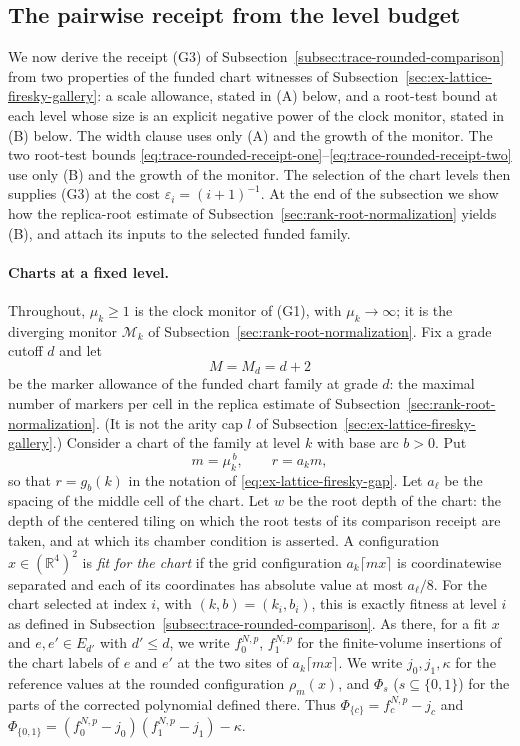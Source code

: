 \subsection{The pairwise receipt from the level budget}
\label{subsec:trace-rounded-receipt}

We now derive the receipt (G3) of
Subsection~\ref{subsec:trace-rounded-comparison} from two properties of
the funded chart witnesses of
Subsection~\ref{sec:ex-lattice-firesky-gallery}: a scale allowance, stated in
(A) below, and a root-test bound at each level whose size is an explicit
negative power of the clock monitor, stated in (B) below. The width clause
uses only (A) and the growth of the monitor. The two root-test bounds
\eqref{eq:trace-rounded-receipt-one}--\eqref{eq:trace-rounded-receipt-two}
use only (B) and the growth of the monitor. The selection of the chart
levels then supplies (G3) at the cost $\varepsilon_i=(i+1)^{-1}$. At the
end of the subsection we show how the replica-root estimate of
Subsection~\ref{sec:rank-root-normalization} yields (B), and attach its inputs to the selected funded family.

\paragraph{Charts at a fixed level.}
Throughout, $\mu_k\ge1$ is the clock monitor of (G1), with
$\mu_k\to\infty$; it is the diverging monitor $\mathcal M_k$ of
Subsection~\ref{sec:rank-root-normalization}. Fix a grade cutoff $d$ and
let
\[
 M=M_d=d+2
\]
be the marker allowance of the funded chart family at grade $d$: the
maximal number of markers per cell in the replica estimate of
Subsection~\ref{sec:rank-root-normalization}. (It is not the arity cap $l$
of Subsection~\ref{sec:ex-lattice-firesky-gallery}.) Consider a chart of the
family at level $k$ with base arc $b>0$. Put
\[
 m=\mu_k^{\,b},\qquad r=a_km,
\]
so that $r=g_b(k)$ in the notation of \eqref{eq:ex-lattice-firesky-gap}.
Let $a_{\ell}$ be the spacing of the middle cell of the chart. Let $w$ be
the root depth of the chart: the depth of the centered tiling on which
the root tests of its comparison receipt are taken, and at which its
chamber condition is asserted. A configuration $x\in(\mathbb R^4)^2$ is
\emph{fit for the chart} if the grid configuration $a_k\lceil mx\rceil$
is coordinatewise separated and each of its coordinates has absolute
value at most $a_\ell/8$. For the chart selected at index $i$, with
$(k,b)=(k_i,b_i)$, this is exactly fitness at level $i$ as defined in
Subsection~\ref{subsec:trace-rounded-comparison}. As there, for a fit
$x$ and $e,e'\in E_{d'}$ with $d'\le d$, we write $f_0^{N,p}$,
$f_1^{N,p}$ for the finite-volume insertions of the chart labels of $e$
and $e'$ at the two sites of $a_k\lceil mx\rceil$. We write
$j_0,j_1,\kappa$ for the reference values at the rounded configuration
$\rho_m(x)$, and $\Phi_s$ ($s\subseteq\{0,1\}$) for the parts of the
corrected polynomial defined there. Thus $\Phi_{\{c\}}=f_c^{N,p}-j_c$ and
$\Phi_{\{0,1\}}=(f_0^{N,p}-j_0)(f_1^{N,p}-j_1)-\kappa$.

